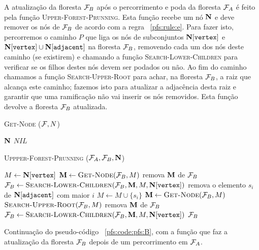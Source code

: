 A atualização da floresta $\mathcal{F}_B$ após o percorrimento e poda da
floresta $\mathcal{F}_A$ é feito pela função \textsc{Upper-Forest-Prunning}.
Esta função recebe um nó $\mathbf N$ e deve remover os nós de 
$\mathcal{F}_B$ de acordo com a regra ~\ref{pfs:rule:e}. Para fazer isto, 
percorremos o caminho $P$ que liga os nós de subconjuntos 
$\mathbf N[\texttt{vertex}]$ e $\mathbf N[\texttt{vertex}] \cup 
\mathbf N[\texttt{adjacent}]$ na floresta $\mathcal{F}_B$, removendo cada
um dos nós deste caminho (se existirem) e chamando a função 
\textsc{Search-Lower-Children} para verificar se os filhos destes nós
devem ser podados ou não. Ao fim do caminho chamamos a função 
\textsc{Search-Upper-Root} para achar, na floresta $\mathcal{F}_B$, a raiz
que alcança este caminho; fazemos isto para atualizar a adjacência desta 
raiz e garantir que uma ramificação não vai inserir os nós removidos. 
Esta função devolve a floresta $\mathcal{F}_B$ atualizada.

\begin{algorithm}[H]
    \textsc{Get-Node} ($\mathcal{F}, N$)
    \begin{algorithmic}[1]
            \Return $\mathbf N$
        \Else
            \Return $NIL$
        \EndIf
    \end{algorithmic}
    \vspace{1em}
    \textsc{Uppper-Forest-Prunning} ($\mathcal{F}_A, \mathcal{F}_B, \mathbf N$)
    \begin{algorithmic}[1]
        \State $M \gets \mathbf N[\texttt{vertex}]$
            \State $\mathbf M \gets {\normalfont\textsc{Get-Node}} (\mathcal{F}_B, M)$
                \State remova $\mathbf M$ de $\mathcal{F}_B$
            \EndIf
            \State $\mathcal{F}_B \gets {\normalfont\textsc{Search-Lower-Children}} (\mathcal{F}_B, \mathbf M, M, \mathbf N[\texttt{vertex}])$
            \State remova o elemento $s_i$ de $\mathbf N[\texttt{adjacent}]$ com maior $i$
            \State $M \gets M \cup \{s_i\}$
        \EndWhile
        \State $\mathbf M \gets {\normalfont\textsc{Get-Node}} (\mathcal{F}_B, M)$
            \State ${\normalfont\textsc{Search-Upper-Root}} (\mathcal{F}_B, M)$
        \Else
            \State remova $\mathbf M$ de $\mathcal{F}_B$
        \EndIf
        \State $\mathcal{F}_B \gets {\normalfont\textsc{Search-Lower-Children}} (\mathcal{F}_B, \mathbf M, M, \mathbf N[\texttt{vertex}])$
        \Return $\mathcal{F}_B$
    \end{algorithmic}
    \caption{Continuação do pseudo-código ~\ref{pfs:code:pfs:B}, com a
    função que faz a atualização da floresta $\mathcal{F}_B$ depois de um 
    percorrimento em $\mathcal{F}_A$.}
    \label{pfs:code:pfs:C}
\end{algorithm}



